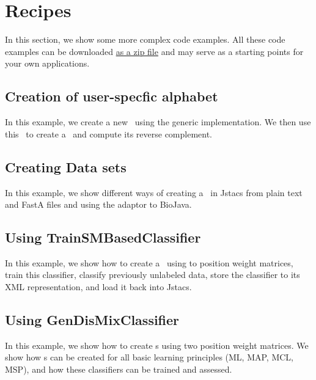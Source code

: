 \section{Recipes}\label{recipes}


In this section, we show some more complex code examples. All these code examples can be downloaded \href{http://www.jstacs.de/downloads/recipes.zip}{as a zip file} and may serve as a starting points for your own applications.

\subsection{Creation of user-specfic alphabet}
In this example, we create a new \ComplementableDiscreteAlphabet~using the generic implementation. We then use this \Alphabet~to create a \Sequence~and compute its reverse complement.
\renewcommand{\codefile}{./recipes/AlphabetCreation.java}
\setcounter{off}{33}

\subsection{Creating Data sets}
In this example, we show different ways of creating a \DataSet~in Jstacs from plain text and FastA files and using the adaptor to BioJava.
\renewcommand{\codefile}{./recipes/DataLoader.java}
\setcounter{off}{42}

\subsection{Using TrainSMBasedClassifier}
In this example, we show how to create a \TrainSMBasedClassifier~using to position weight matrices, train this classifier, classify previously unlabeled data, store the classifier to its XML representation, and load it back into Jstacs.
\renewcommand{\codefile}{./recipes/TrainSMBasedClassifierTest.java}
\setcounter{off}{53}

\subsection{Using GenDisMixClassifier}
In this example, we show how to create \GenDisMixClassifier s using two position weight matrices. We show how \GenDisMixClassifier s can be created for all basic learning principles (ML, MAP, MCL, MSP), and how these classifiers can be trained and assessed.
\renewcommand{\codefile}{./recipes/GenDisMixClassifierTest.java}
\setcounter{off}{54}

